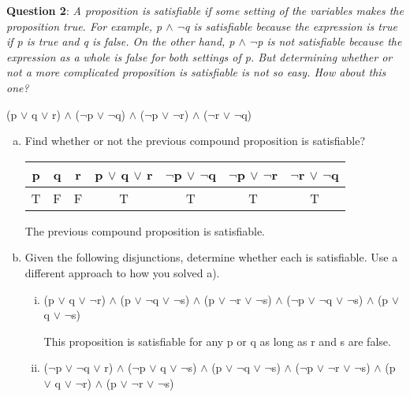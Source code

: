 \documentclass{article} %
\newcommand{\question}[2][]{\begin{flushleft}
        \textbf{Question #1}: \textit{#2}

\end{flushleft}}
\begin{document}
    \question[2]{A proposition is satisfiable if some setting of the variables makes the proposition true. For example, p $\land$ $\neg$q is satisfiable because the expression is true if p is true and q is false. On the other hand, p $\land$ $\neg$p is not satisfiable because the expression as a whole is false for both settings of p. But determining whether or not a more complicated proposition is satisfiable is not so easy. How about this one?}

    \begin{center}
        (p $\lor$ q $\lor$ r) $\land$ ($\neg$p $\lor$ $\neg$q) $\land$ ($\neg$p $\lor$ $\neg$r) $\land$ ($\neg$r $\lor$ $\neg$q)
    \end{center}

    \begin{enumerate}[a.]
        \item {Find whether or not the previous compound proposition is satisfiable?}
        
        \begin{center}
            \begin{tabular}{|c|c|c|c|c|c|c|}
                \hline
                p & q & r & p $\lor$ q $\lor$ r & $\neg$p $\lor$ $\neg$q & $\neg$p $\lor$ $\neg$r & $\neg$r $\lor$ $\neg$q \\
                \hline
                T & F & F & T & T & T & T \\
                \hline
            \end{tabular}

        \end{center}

        The previous compound proposition is satisfiable.

        \item {Given the following disjunctions, determine whether each is satisfiable. Use a different approach to how
        you solved a).}
        \begin{enumerate}[i)]
            \item {(p $\lor$ q $\lor$ $\neg$r) $\land$ (p $\lor$ $\neg$q $\lor$ $\neg$s) $\land$ (p $\lor$ $\neg$r $\lor$ $\neg$s) $\land$ ($\neg$p $\lor$ $\neg$q $\lor$ $\neg$s) $\land$ (p $\lor$ q $\lor$ $\neg$s)}
            
            This proposition is satisfiable for any p or q as long as r and s are false.

            \item {($\neg$p $\lor$ $\neg$q $\lor$ r) $\land$ ($\neg$p $\lor$ q $\lor$ $\neg$s) $\land$ (p $\lor$ $\neg$q $\lor$ $\neg$s) $\land$ ($\neg$p $\lor$ $\neg$r $\lor$ $\neg$s) $\land$ (p $\lor$ q $\lor$ $\neg$r) $\land$ (p $\lor$ $\neg$r $\lor$ $\neg$s)}
            

\end{enumerate}
\end{enumerate}
\end{document}
